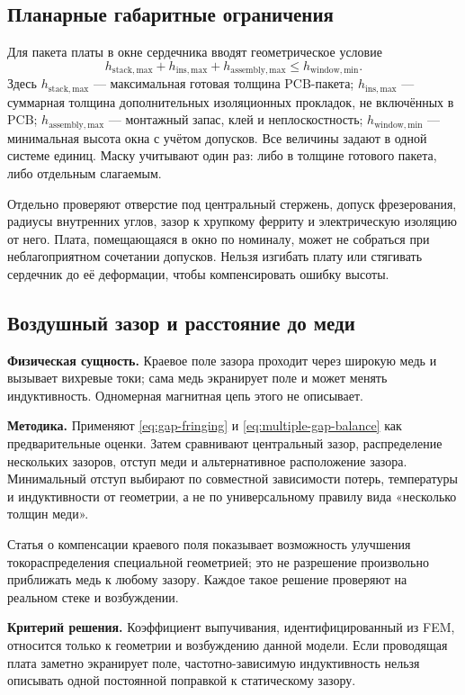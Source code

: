 \documentclass[14pt,a4paper]{extarticle}
\newcommand{\phys}{\par\noindent\textbf{Физическая сущность.} }
\newcommand{\method}{\par\noindent\textbf{Методика.} }
\newcommand{\criterion}{\par\noindent\textbf{Критерий решения.} }
\begin{document}
\subsection{Планарные габаритные ограничения}
Для пакета платы в окне сердечника вводят геометрическое условие
\begin{equation}
 h_{\mathrm{stack,max}}+h_{\mathrm{ins,max}}+h_{\mathrm{assembly,max}}
 \leq h_{\mathrm{window,min}}.
 \label{pl:eq:height}
\end{equation}
Здесь $h_{\mathrm{stack,max}}$ --- максимальная готовая толщина PCB-пакета; $h_{\mathrm{ins,max}}$ --- суммарная толщина дополнительных изоляционных прокладок, не включённых в PCB; $h_{\mathrm{assembly,max}}$ --- монтажный запас, клей и неплоскостность; $h_{\mathrm{window,min}}$ --- минимальная высота окна с учётом допусков. Все величины задают в одной системе единиц. Маску учитывают один раз: либо в толщине готового пакета, либо отдельным слагаемым.

Отдельно проверяют отверстие под центральный стержень, допуск фрезерования, радиусы внутренних углов, зазор к хрупкому ферриту и электрическую изоляцию от него. Плата, помещающаяся в окно по номиналу, может не собраться при неблагоприятном сочетании допусков. Нельзя изгибать плату или стягивать сердечник до её деформации, чтобы компенсировать ошибку высоты.

\subsection{Воздушный зазор и расстояние до меди}
\phys Краевое поле зазора проходит через широкую медь и вызывает вихревые токи; сама медь экранирует поле и может менять индуктивность. Одномерная магнитная цепь этого не описывает.\cite{ewaldfoil,schaefer}

\method Применяют \eqref{eq:gap-fringing} и \eqref{eq:multiple-gap-balance} как предварительные оценки. Затем сравнивают центральный зазор, распределение нескольких зазоров, отступ меди и альтернативное расположение зазора. Минимальный отступ выбирают по совместной зависимости потерь, температуры и индуктивности от геометрии, а не по универсальному правилу вида «несколько толщин меди».

Статья о компенсации краевого поля показывает возможность улучшения токораспределения специальной геометрией; это не разрешение произвольно приближать медь к любому зазору.\cite{schaefer} Каждое такое решение проверяют на реальном стеке и возбуждении.

\criterion Коэффициент выпучивания, идентифицированный из FEM, относится только к геометрии и возбуждению данной модели. Если проводящая плата заметно экранирует поле, частотно-зависимую индуктивность нельзя описывать одной постоянной поправкой к статическому зазору.
\end{document}
